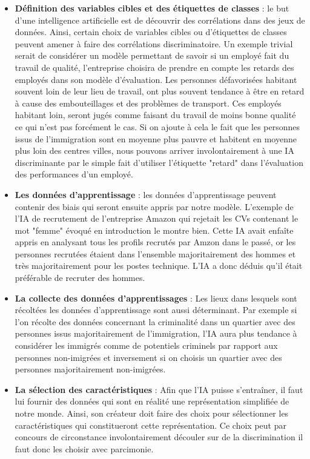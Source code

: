 \begin{itemize}
    \item \textbf{Définition des variables cibles et des étiquettes de classes} : le but d'une intelligence artificielle est de découvrir des corrélations dans des jeux de données. Ainsi, certain choix de variables cibles ou d'étiquettes de classes peuvent amener à faire des corrélations discriminatoire. Un exemple trivial serait de considérer un modèle permettant de savoir si un employé fait du travail de qualité, l'entreprise choisira de prendre en compte les retards des employés dans son modèle d'évaluation. Les personnes défavorisées habitant souvent loin de leur lieu de travail, ont plus souvent tendance à être en retard à cause des embouteillages et des problèmes de transport. Ces employés habitant loin, seront jugés comme faisant du travail de moins bonne qualité ce qui n'est pas forcément le cas. Si on ajoute à cela le fait que les personnes issus de l'immigration sont en moyenne plus pauvre et habitent en moyenne plus loin des centres villes, nous pouvons arriver involontairement à une IA discriminante par le simple fait d'utiliser l'étiquette "retard" dans l'évaluation des performances d'un employé.
    \item \textbf{Les données d'apprentissage} : les données d'apprentissage peuvent contenir des biais qui seront ensuite appris par notre modèle. L'exemple de l'IA de recrutement de l'entreprise Amazon qui rejetait les CVs contenant le mot "femme"\cite{amazonAi} évoqué en introduction le montre bien. Cette IA avait enfaîte appris en analysant tous les profils recrutés par Amzon dans le passé, or les personnes recrutées étaient dans l'ensemble majoritairement des hommes et très majoritairement pour les postes technique. L'IA a donc déduis qu'il était préférable de recruter des hommes.
    \item \textbf{La collecte des données d'apprentissages} : Les lieux dans lesquels sont récoltées les données d'apprentissage sont aussi déterminant. Par exemple si l'on récolte des données concernant la criminalité dans un quartier avec des personnes issus majoritairement de l'immigration, l'IA aura plus tendance à considérer les immigrés comme de potentiels criminels par rapport aux personnes non-imigrées et inversement si on choisis un quartier avec des personnes majoritairement non-imigrées.
    \item \textbf{La sélection des caractéristiques} : Afin que l'IA puisse s'entraîner, il faut lui fournir des données qui sont en réalité une représentation simplifiée de notre monde. Ainsi, son créateur doit faire des choix pour sélectionner les caractéristiques qui constitueront cette représentation. Ce choix peut par concours de circonstance involontairement découler sur de la discrimination il faut donc les choisir avec parcimonie.

\end{itemize}
